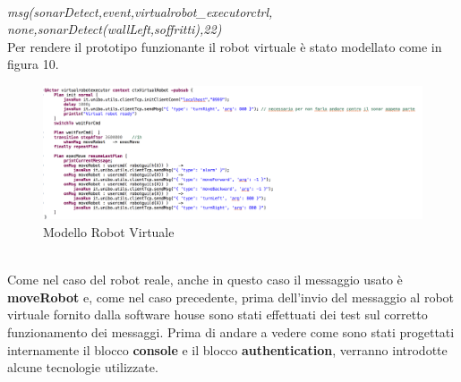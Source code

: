 \documentclass{llncs}
\begin{document}
\\
\textit{msg(sonarDetect,event,virtualrobot\_executorctrl, none,sonarDetect(wallLeft,soffritti),22)}
\\
\vspace*{1ex}
Per rendere il prototipo funzionante il robot virtuale \`e stato modellato come in figura 10.\\
\begin{figure}
    \centering
    \includegraphics[width=1\textwidth]{Immagini/virtualrobotexecutor(requisito1).png}
    \caption{Modello Robot Virtuale}
    \label{fig:my_label}
\end{figure}
\\
\vspace*{1ex}
Come nel caso del robot reale, anche in questo caso il messaggio usato \`e \textbf{moveRobot} e, come nel caso precedente, prima dell'invio del messaggio al robot virtuale fornito dalla software house sono stati effettuati dei test sul corretto funzionamento dei messaggi. 
Prima di andare a vedere come sono stati progettati internamente il blocco \textbf{console} e il blocco \textbf{authentication}, verranno introdotte alcune tecnologie utilizzate.


\end{document}
